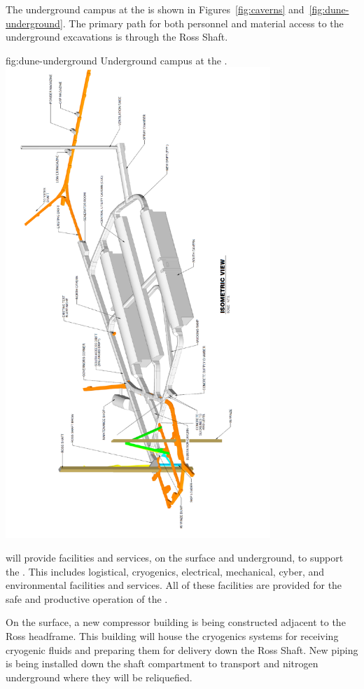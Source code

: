 The  underground campus at the   is shown in
Figures~\ref{fig:caverns} and~\ref{fig:dune-underground}. The primary path for both personnel 
and material access to the underground excavations is through the Ross Shaft.
\begin{dunefigure}{fig:dune-underground}
  {Underground campus at the .}
  \includegraphics[width=0.75\textwidth]{graphics/underground_campus_vertical}
\end{dunefigure}

 will provide facilities and services, on the surface and
underground, to support the  .  This includes
logistical, cryogenics, electrical, mechanical, cyber, and environmental
facilities and services.  All of these facilities are provided for the
safe and productive operation of the .

On the surface, a new compressor building is being constructed
adjacent to the Ross headframe.  This building will house the cryogenics
systems for receiving cryogenic fluids and preparing them for delivery
down the Ross Shaft.  New piping is being installed down the 
shaft compartment to transport  and nitrogen underground
where they will be reliquefied.


